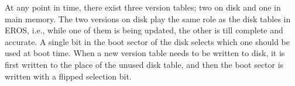 At any point in time, there exist three version tables; two on disk
and one in main memory.  The two versions on disk play the same role
as the disk tables in EROS, i.e., while one of them is being updated,
the other is till complete and accurate.  A single bit in the boot
sector of the disk selects which one should be used at boot time.
When a new version table needs to be written to disk, it is first
written to the place of the unused disk table, and then the boot
sector is written with a flipped selection bit. 


